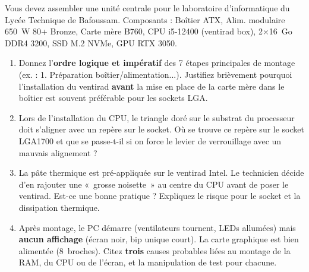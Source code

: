 \documentclass[11pt]{article}
\begin{document}
\begin{exercice}
Vous devez assembler une unité centrale pour le laboratoire d'informatique du Lycée Technique de Bafoussam. Composants : Boîtier ATX, Alim. modulaire 650~W 80+ Bronze, Carte mère B760, CPU i5-12400 (ventirad box), 2$\times$16~Go DDR4 3200, SSD M.2 NVMe, GPU RTX 3050.
\begin{enumerate}
    \item Donnez l'\textbf{ordre logique et impératif} des 7 étapes principales de montage (ex. : 1. Préparation boîtier/alimentation...). Justifiez brièvement pourquoi l'installation du ventirad \textbf{avant} la mise en place de la carte mère dans le boîtier est souvent préférable pour les sockets LGA.
    \item Lors de l'installation du CPU, le triangle doré sur le substrat du processeur doit s'aligner avec un repère sur le socket. Où se trouve ce repère sur le socket LGA1700 et que se passe-t-il si on force le levier de verrouillage avec un mauvais alignement ?
    \item La pâte thermique est pré-appliquée sur le ventirad Intel. Le technicien décide d'en rajouter une «~grosse noisette~» au centre du CPU avant de poser le ventirad. Est-ce une bonne pratique ? Expliquez le risque pour le socket et la dissipation thermique.
    \item Après montage, le PC démarre (ventilateurs tournent, LEDs allumées) mais \textbf{aucun affichage} (écran noir, bip unique court). La carte graphique est bien alimentée (8~broches). Citez \textbf{trois} causes probables liées au montage de la RAM, du CPU ou de l'écran, et la manipulation de test pour chacune.
\end{enumerate}
\end{exercice}
\end{document}
